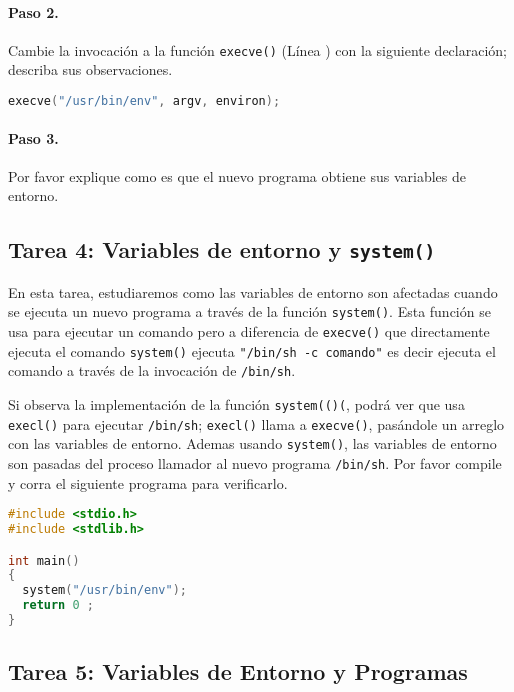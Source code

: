\paragraph{Paso 2.} Cambie la invocación a la función {\tt execve()} (Línea ) con la siguiente declaración; describa sus observaciones.


\begin{lstlisting}[language=C]
execve("/usr/bin/env", argv, environ);
\end{lstlisting}


\paragraph{Paso 3.} Por favor explique como es que el nuevo programa obtiene sus variables de entorno.



\subsection{Tarea 4: Variables de entorno y {\tt system()}}

En esta tarea, estudiaremos como las variables de entorno son afectadas cuando se ejecuta un nuevo programa a través de la función {\tt system()}. Esta función se usa para ejecutar un comando pero a diferencia de {\tt execve()} que directamente ejecuta el comando {\tt system()} ejecuta \texttt{"/bin/sh -c comando"} es decir ejecuta el comando a través de la invocación de {\tt /bin/sh}.

Si observa la implementación de la función {\tt system(()(}, podrá ver que usa {\tt execl()} para ejecutar {\tt /bin/sh}; {\tt execl()} llama a {\tt execve()}, pasándole un arreglo con las variables de entorno. 
Ademas usando {\tt system()}, las variables de entorno son pasadas del proceso llamador al nuevo programa {\tt /bin/sh}. Por favor compile y corra el siguiente programa para verificarlo.


\begin{lstlisting}[language=C]
#include <stdio.h>
#include <stdlib.h>

int main()
{
  system("/usr/bin/env");
  return 0 ;
}
\end{lstlisting}



\subsection{Tarea 5: Variables de Entorno y Programas \setuid }

